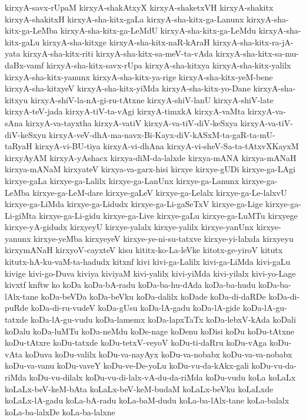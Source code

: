 {kirxyA-savx-rUpaM
kirxyA-shakAtxyX
kirxyA-shaketxVH
kirxyA-shakitx
kirxyA-shakitxH
kirxyA-sha-kitx-gaLa
kirxyA-sha-kitx-ga-Lanunx
kirxyA-sha-kitx-ga-LeMba
kirxyA-sha-kitx-ga-LeMdU
kirxyA-sha-kitx-ga-LeMdu
kirxyA-sha-kitx-gaLu
kirxyA-sha-kitxge
kirxyA-sha-kitx-naR-kAraH
kirxyA-sha-kitx-ra-jA-yata
kirxyA-sha-kitx-riti
kirxyA-sha-kitx-sa-meV-ta-vAda
kirxyA-sha-kitx-sa-mu-daBx-vamf
kirxyA-sha-kitx-savx-rUpa
kirxyA-sha-kitxya
kirxyA-sha-kitx-yalilx
kirxyA-sha-kitx-yanunx
kirxyA-sha-kitx-ya-rige
kirxyA-sha-kitx-yeM-bene
kirxyA-sha-kitxyeV
kirxyA-sha-kitx-yiMda
kirxyA-sha-kitx-yo-Dane
kirxyA-sha-kitxyu
kirxyA-shiV-la-nA-gi-ru-tAtxne
kirxyA-shiV-lanU
kirxyA-shiV-late
kirxyA-teV-jada
kirxyA-tiV-ta-vAgi
kirxyA-timxkA
kirxyA-vaMta
kirxyA-va-sAna
kirxyA-va-tayxtha
kirxyA-vatiV
kirxyA-va-tiV-diV-keSxya
kirxyA-va-tiV-diV-keSxyu
kirxyA-veV-dhA-ma-navx-Bi-Kayx-diV-kASxM-ta-gaR-ta-mU-taRyaH
kirxyA-vi-BU-tiya
kirxyA-vi-dhAna
kirxyA-vi-sheV-Sa-ta-tAtxvXKayxM
kirxyAyAM
kirxyA-yAshacx
kirxya-diM-da-lalxde
kirxya-mANA
kirxya-mANaH
kirxya-mANaM
kirxyateV
kirxya-va-garx-hisi
kirxye
kirxye-gUDi
kirxye-ga-LAgi
kirxye-gaLa
kirxye-ga-Lalilx
kirxye-ga-LanUnx
kirxye-ga-Lanunx
kirxye-ga-LeMba
kirxye-ga-LeM-dare
kirxye-gaLeV
kirxye-ga-Lelalx
kirxye-ga-Le-lalxvU
kirxye-ga-LiMda
kirxye-ga-Lidudx
kirxye-ga-Li-gaSeTxV
kirxye-ga-Lige
kirxye-ga-Li-giMta
kirxye-ga-Li-gidu
kirxye-ga-Live
kirxye-gaLu
kirxye-ga-LuMTu
kirxyege
kirxye-yA-gidudx
kirxyeyU
kirxye-yalalx
kirxye-yalilx
kirxye-yanUnx
kirxye-yanunx
kirxye-yeMba
kirxyeyeV
kirxye-ye-ni-su-tatxve
kirxye-yi-lalxda
kirxyeyu
kirxymANaH
kirxyoV-cayxteV
kisu
kititx-ko-La-leVke
kitotx-ge-yiroV
kitutx
kitutx-hA-ku-vaM-ta-hadudx
kitxnf
kivi
kivi-ga-Lalilx
kivi-ga-LiMda
kivi-gaLu
kivige
kivi-go-Duva
kiviya
kiviyaM
kivi-yalilx
kivi-yiMda
kivi-yilalx
kivi-yo-Lage
kivxtf
knftw
ko
koDa
koDa-bA-radu
koDa-ba-hu-dAda
koDa-ba-hudu
koDa-ba-lAlx-tane
koDa-beVDa
koDa-beVku
koDa-dalilx
koDade
koDa-di-daRDe
koDa-di-puRde
koDa-di-ru-vudeV
koDa-gUsu
koDa-lA-gadu
koDa-lA-gide
koDa-lA-gu-tatxde
koDa-lA-gu-vudu
koDa-lamemx
koDa-lapxTaTx
koDa-lebxV-kAda
koDali
koDalu
koDa-luMTu
koDa-neMdu
koDe-nage
koDenu
koDisi
koDu
koDu-tAtxne
koDu-tAtxre
koDu-tatxde
koDu-tetxV-veyoV
koDu-ti-daRru
koDu-vAga
koDu-vAta
koDuva
koDu-valilx
koDu-va-nayAyx
koDu-va-nobabx
koDu-va-va-nobabx
koDu-va-vanu
koDu-vaveY
koDu-ve-De-yoLu
koDu-vu-da-kAkx-gali
koDu-vu-da-riMda
koDu-vu-dilalx
koDu-vu-di-lalx-vA-du-da-riMda
koDu-vudu
koLa
koLaLx
koLaLx-beV-keM-bAta
koLaLx-beV-keM-budaM
koLaLx-beVku
koLaLxde
koLaLx-lA-gadu
koLa-bA-radu
koLa-baM-dudu
koLa-ba-lAlx-tane
koLa-balalx
koLa-ba-lalxDe
koLa-ba-lalxne
}
